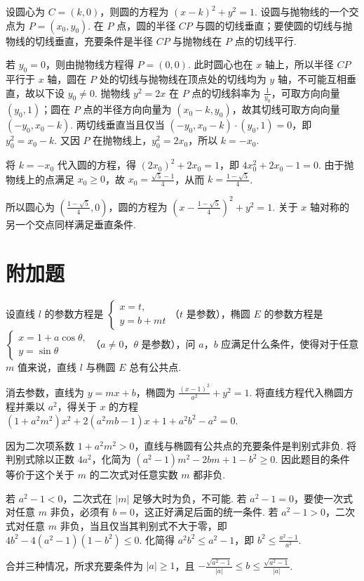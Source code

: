 \documentclass[UTF8,a4paper,oneside,11pt]{ctexbook}
\begin{document}
\begin{solution}
设圆心为 \(C=(k,0)\)，则圆的方程为 \((x-k)^2+y^2=1\). 设圆与抛物线的一个交点为 \(P=(x_0,y_0)\). 在 \(P\) 点，圆的半径 \(CP\) 与圆的切线垂直；要使圆的切线与抛物线的切线垂直，充要条件是半径 \(CP\) 与抛物线在 \(P\) 点的切线平行.

若 \(y_0=0\)，则由抛物线方程得 \(P=(0,0)\). 此时圆心也在 \(x\) 轴上，所以半径 \(CP\) 平行于 \(x\) 轴，圆在 \(P\) 处的切线与抛物线在顶点处的切线均为 \(y\) 轴，不可能互相垂直，故以下设 \(y_0\neq0\). 抛物线 \(y^2=2x\) 在 \(P\) 点的切线斜率为 \(\frac1{y_0}\)，可取方向向量 \((y_0,1)\)；圆在 \(P\) 点的半径方向向量为 \((x_0-k,y_0)\)，故其切线可取方向向量 \((-y_0,x_0-k)\). 两切线垂直当且仅当
\((-y_0,x_0-k)\cdot(y_0,1)=0\)，即 \(y_0^2=x_0-k\). 又因 \(P\) 在抛物线上，\(y_0^2=2x_0\)，所以 \(k=-x_0\).

将 \(k=-x_0\) 代入圆的方程，得 \((2x_0)^2+2x_0=1\)，即 \(4x_0^2+2x_0-1=0\). 由于抛物线上的点满足 \(x_0\geq0\)，故 \(x_0=\frac{\sqrt{5}-1}{4}\)，从而 \(k=\frac{1-\sqrt{5}}{4}\).

所以圆心为 \(\left(\frac{1-\sqrt{5}}{4},0\right)\)，圆的方程为 \(\left(x-\frac{1-\sqrt{5}}{4}\right)^2+y^2=1\). 关于 \(x\) 轴对称的另一个交点同样满足垂直条件.
\end{solution}

\section{附加题}

\begin{problem}
设直线 \(l\) 的参数方程是 \(\begin{cases}
x=t,\\
y=b+mt
\end{cases}\)（\(t\) 是参数），椭圆 \(E\) 的参数方程是 \(\begin{cases}
x=1+a\cos\theta,\\
y=\sin\theta
\end{cases}\)（\(a\neq0\)，\(\theta\) 是参数），问 \(a\)，\(b\) 应满足什么条件，使得对于任意 \(m\) 值来说，直线 \(l\) 与椭圆 \(E\) 总有公共点.
\end{problem}

\begin{solution}
消去参数，直线为 \(y=mx+b\)，椭圆为 \(\frac{(x-1)^2}{a^2}+y^2=1\). 将直线方程代入椭圆方程并乘以 \(a^2\)，得关于 \(x\) 的方程 \((1+a^2m^2)x^2+2(a^2mb-1)x+1+a^2b^2-a^2=0\).

因为二次项系数 \(1+a^2m^2>0\)，直线与椭圆有公共点的充要条件是判别式非负. 将判别式除以正数 \(4a^2\)，化简为 \((a^2-1)m^2-2bm+1-b^2\geq0\). 因此题目的条件等价于这个关于 \(m\) 的二次式对任意实数 \(m\) 都非负.

若 \(a^2-1<0\)，二次式在 \(\lvert m\rvert\) 足够大时为负，不可能. 若 \(a^2-1=0\)，要使一次式对任意 \(m\) 非负，必须有 \(b=0\)，这正好满足后面的统一条件. 若 \(a^2-1>0\)，二次式对任意 \(m\) 非负，当且仅当其判别式不大于零，即 \(4b^2-4(a^2-1)(1-b^2)\leq0\). 化简得 \(a^2b^2\leq a^2-1\)，即 \(b^2\leq\frac{a^2-1}{a^2}\).

合并三种情况，所求充要条件为 \(\lvert a\rvert\geq1\)，且 \(-\frac{\sqrt{a^2-1}}{\lvert a\rvert}\leq b\leq\frac{\sqrt{a^2-1}}{\lvert a\rvert}\).
\end{solution}

\end{document}
